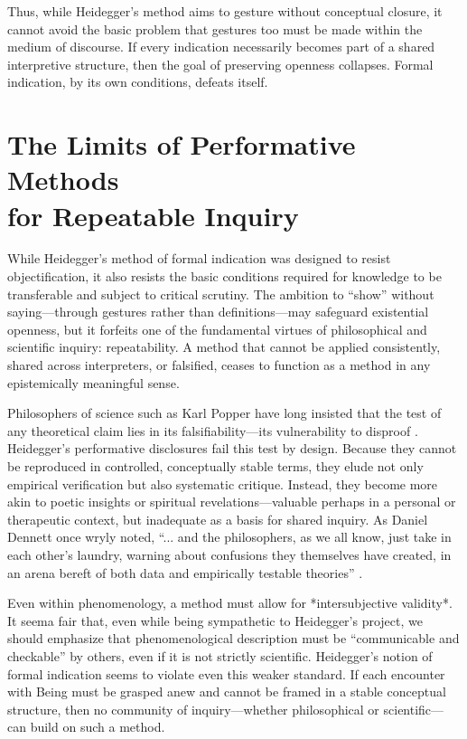 \documentclass{article}
\begin{document}
Thus, while Heidegger’s method aims to gesture without conceptual closure, it cannot avoid the basic problem that gestures too must be made within the medium of discourse. If every indication necessarily becomes part of a shared interpretive structure, then the goal of preserving openness collapses. Formal indication, by its own conditions, defeats itself.

\section*{The Limits of Performative Methods \\ for Repeatable Inquiry}

While Heidegger's method of formal indication was designed to resist objectification, it also resists the basic conditions required for knowledge to be transferable and subject to critical scrutiny. The ambition to “show” without saying—through gestures rather than definitions—may safeguard existential openness, but it forfeits one of the fundamental virtues of philosophical and scientific inquiry: repeatability. A method that cannot be applied consistently, shared across interpreters, or falsified, ceases to function as a method in any epistemically meaningful sense.

Philosophers of science such as Karl Popper have long insisted that the test of any theoretical claim lies in its falsifiability—its vulnerability to disproof \parencite[pp.~39–42]{popper2002}. Heidegger's performative disclosures fail this test by design. Because they cannot be reproduced in controlled, conceptually stable terms, they elude not only empirical verification but also systematic critique. Instead, they become more akin to poetic insights or spiritual revelations—valuable perhaps in a personal or therapeutic context, but inadequate as a basis for shared inquiry. As Daniel Dennett once wryly noted, “... and the philosophers, as we all know, just take in each other’s laundry, warning about confusions they themselves have created, in an arena bereft of both data and empirically testable theories” \parencite[p.~255]{dennett1991}.

Even within phenomenology, a method must allow for *intersubjective validity*. It seema fair that, even while being sympathetic to Heidegger’s project, we should emphasize that phenomenological description must be “communicable and checkable” by others, even if it is not strictly scientific. Heidegger’s notion of formal indication seems to violate even this weaker standard. If each encounter with Being must be grasped anew and cannot be framed in a stable conceptual structure, then no community of inquiry—whether philosophical or scientific—can build on such a method.
\end{document}
